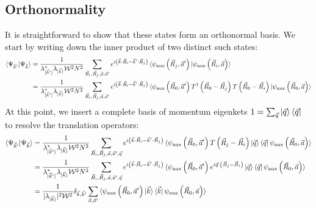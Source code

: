 \documentclass{report}
\numberwithin{equation}{section}
\begin{document}
\begin{appendices}
\section{Orthonormality}
It is straightforward to show that these states form an orthonormal basis. We start by writing down the inner product of two distinct such states:
\begin{equation}\begin{aligned}
	\braket{\Psi_{\vec k^\prime} | \Psi_{\vec k}} 
	&= \frac{1}{\lambda_{\ket{\vec k^\prime}}^* \lambda_{\ket{\vec k}} \mathcal{W}^2 N^2}\sum_{\vec R_i, \vec R_j, \vec a, \vec a^\prime} e^{i \left(\vec{k}\cdot\vec{R}_i - \vec{k}^\prime\cdot\vec{R}_j\right) } \braket{\psi_\text{aux}\left( \vec R_j, \vec a^\prime \right) | \psi_\text{aux}\left( \vec R_i, \vec a \right)} \\
	&= \frac{1}{\lambda_{\ket{\vec k^\prime}}^* \lambda_{\ket{\vec k}} \mathcal{W}^2 N^2}\sum_{\vec R_i, \vec R_j, \vec a, \vec a^\prime} e^{i \left(\vec{k}\cdot\vec{R}_i - \vec{k}^\prime\cdot\vec{R}_j\right) } \braket{\psi_\text{aux}\left( \vec R_0, \vec a^\prime \right) T^\dagger\left( \vec R_0 - \vec R_j \right) T\left( \vec R_0 - \vec R_i \right) | \psi_\text{aux}\left( \vec R_0, \vec a \right)}\\
\end{aligned}\end{equation}
At this point, we insert a complete basis of momentum eigenkets \(1 = \sum_{\vec q}\ket{\vec q}\bra{\vec q}\) to resolve the translation operators:
\begin{equation}\begin{aligned}
	\braket{\Psi_{\vec k^\prime} | \Psi_{\vec k}} &= \frac{1}{\lambda_{\ket{\vec k^\prime}}^* \lambda_{\ket{\vec k}} \mathcal{W}^2 N^2}\sum_{\vec R_i, \vec R_j, \vec a, \vec a^\prime, \vec q} e^{i \left(\vec{k}\cdot\vec{R}_i - \vec{k}^\prime\cdot\vec{R}_j\right) } \braket{\psi_\text{aux}\left( \vec R_0, \vec a^\prime \right) T\left( \vec R_j - \vec R_i \right) \ket{\vec q}\bra{\vec q} \psi_\text{aux}\left( \vec R_0, \vec a \right)}\\
						      &= \frac{1}{\lambda_{\ket{\vec k^\prime}}^* \lambda_{\ket{\vec k}} \mathcal{W}^2 N^2}\sum_{\vec R_i, \vec R_j, \vec a, \vec a^\prime, \vec q} e^{i \left(\vec{k}\cdot\vec{R}_i - \vec{k}^\prime\cdot\vec{R}_j\right) } \braket{\psi_\text{aux}\left( \vec R_0, \vec a^\prime \right) e^{i \vec q \cdot \left( \vec R_j - \vec R_i \right)} \ket{\vec q}\bra{\vec q} \psi_\text{aux}\left( \vec R_0, \vec a \right)} \\
						      &= \frac{1}{|\lambda_{\ket{\vec k}}|^2 \mathcal{W}^2} \delta_{\vec k, \vec k^\prime}\sum_{\vec a, \vec a^\prime}\braket{\psi_\text{aux}\left( \vec R_0, \vec a^\prime \right) \ket{\vec k}\bra{\vec k} \psi_\text{aux}\left( \vec R_0, \vec a \right)}\\

\end{aligned}
\end{equation}
\end{appendices}
\end{document}
